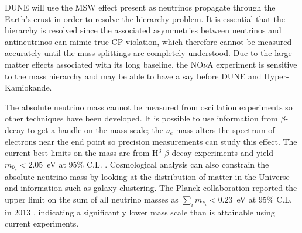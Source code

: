DUNE will use the MSW effect present as neutrinos propagate through the Earth's crust in order to resolve the hierarchy problem.  It is essential that the hierarchy is resolved since the associated asymmetries between neutrinos and antineutrinos can mimic true CP violation, which therefore cannot be measured accurately until the mass splittings are completely understood.  Due to the large matter effects associated with its long baseline, the NO$\nu$A experiment is sensitive to the mass hierarchy and may be able to have a say before DUNE and Hyper-Kamiokande.

The absolute neutrino mass cannot be measured from oscillation experiments so other techniques have been developed.  It is possible to use information from $\beta$-decay to get a handle on the mass scale; the $\bar{\nu}_e$ mass alters the spectrum of electrons near the end point so precision measurements can study this effect.  The current best limits on the mass are from H$^3$ $\beta$-decay experiments and yield $m_{\bar{\nu}_e} < 2.05$~eV at 95\% C.L. \cite{Triotsk2011,Mainz2005}.  Cosmological analysis can also constrain the absolute neutrino mass by looking at the distribution of matter in the Universe and information such as galaxy clustering.  The Planck collaboration reported the upper limit on the sum of all neutrino masses as $\sum_i m_{\nu_i} < 0.23$~eV at 95\% C.L. in 2013 \cite{Planck2013}, indicating a significantly lower mass scale than is attainable using current experiments.
